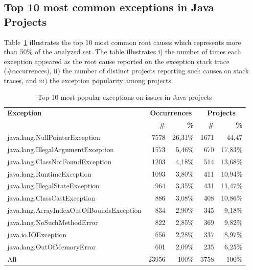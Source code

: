 \documentclass[conference]{IEEEtran}
\begin{document}
\subsection{Top 10 most common exceptions in Java Projects}

Table~\ref{tab:toptenjava} illustrates the top 10 most common root causes which
represents more than 50\% of the analyzed set. The table illustrates  i) the
number of times each exception appeared as the root cause reported on the exception stack trace
(\#occurrences), ii) the number of distinct projects reporting such causes on
stack traces, and iii) the exception popularity among projects.

\begin{table}
\begin{tabular}{lrrrr}
    \hline
    \bfseries{Exception} &  \multicolumn{2}{c}{\bfseries{Occurrences}} &  \multicolumn{2}{c}{\bfseries{Projects}}\\
    & \bfseries{\#} &  \bfseries{\%} & \bfseries{\# } & \bfseries{\% } \\
    \hline
java.lang.NullPointerException             & 7578 & 26,31\% & 1671 & 44,47 \\
java.lang.IllegalArgumentException         & 1573 & 5,46\%  & 670  & 17,83\% \\
java.lang.ClassNotFoundException           & 1203 & 4,18\%  & 514  & 13,68\% \\
java.lang.RuntimeException                 & 1093 & 3,80\%  & 411  & 10,94\% \\
java.lang.IllegalStateException            & 964  & 3,35\%  & 431  & 11,47\% \\
java.lang.ClassCastException               & 886  & 3,08\%  & 408  & 10,86\% \\
java.lang.ArrayIndexOutOfBoundsException   & 834  & 2,90\%  & 345  & 9,18\% \\
java.lang.NoSuchMethodError                & 822  & 2,85\%  & 369  & 9,82\% \\
java.io.IOException                        & 656  & 2,28\%  & 337  & 8,97\% \\
java.lang.OutOfMemoryError                 & 601  & 2,09\%  & 235  & 6,25\% \\
\hline
All	 &	23956 &	100\%	& 3758 & 100\%	 \\
\hline
  \end{tabular}
\caption{Top 10 most popular exceptions on issues in Java projects}
\label{tab:toptenjava}
\end{table}
\end{document}
